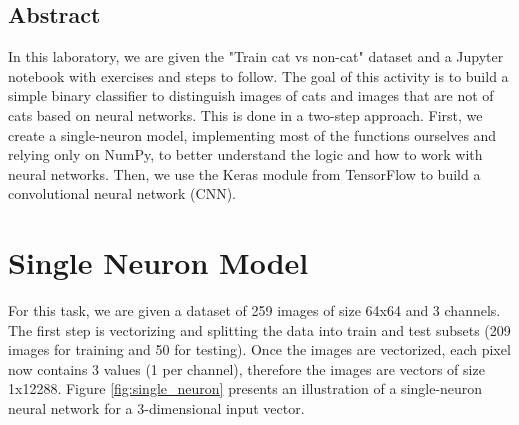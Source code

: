 \documentclass{thesisreport}
\begin{document}



\section*{Abstract}
In this laboratory, we are given the "Train cat vs non-cat" dataset and a Jupyter notebook with exercises and steps to follow. The goal of this activity is to build a simple binary classifier to distinguish images of cats and images that are not of cats based on neural networks. This is done in a two-step approach. First, we create a single-neuron model, implementing most of the functions ourselves and relying only on NumPy, to better understand the logic and how to work with neural networks. Then, we use the Keras module from TensorFlow to build a convolutional neural network (CNN).

\newpage
\newpage
\listoffigures
\listoftables
\tableofcontents

\chapter{Single Neuron Model}
For this task, we are given a dataset of 259 images of size 64x64 and 3 channels. The first step is vectorizing and splitting the data into train and test subsets (209 images for training and 50 for testing). Once the images are vectorized, each pixel now contains 3 values (1 per channel), therefore the images are vectors of size 1x12288. Figure \ref{fig:single_neuron} presents an illustration of a single-neuron neural network for a 3-dimensional input vector.
\end{document}
